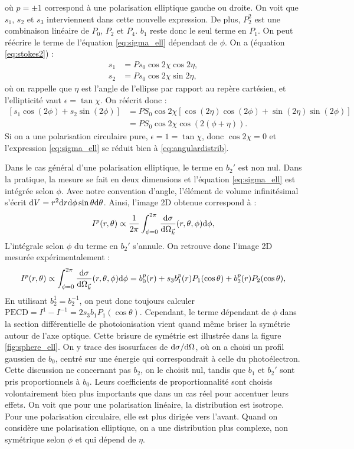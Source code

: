 où $p=\pm1$ correspond à une polarisation elliptique gauche ou droite. On voit que $s_1$, $s_2$ et $s_3$ interviennent dans cette nouvelle expression. De plus, $P_2^2$ est une combinaison linéaire de $P_0$, $P_2$ et $P_4$. $b_1$ reste donc le seul terme en $P_1$. On peut réécrire le terme de l'équation \ref{eq:sigma_ell} dépendant de $\phi$. On a (équation \ref{eq:stokes2}) :
\begin{align}
s_1 &= Ps_0\cos 2\chi\cos 2\eta ,\\
s_2 &= Ps_0\cos 2\chi\sin 2\eta,
\end{align}
où on rappelle que $\eta$ est l'angle de l'ellipse par rapport au repère cartésien, et l'ellipticité vaut $\epsilon=\tan\chi$. On réécrit donc :
\begin{align}
\left[s_1\cos(2\phi)+s_2\sin(2\phi)\right] &= PS_0\cos 2\chi\left[\cos(2\eta)\cos(2\phi)+\sin(2\eta)\sin(2\phi)\right]\\
&= PS_0\cos 2\chi \cos(2(\phi+\eta)).
\end{align}
Si on a une polarisation circulaire pure, $\epsilon = 1 = \tan\chi$, donc $\cos2\chi = 0$ et l'expression \ref{eq:sigma_ell} se réduit bien à \ref{eq:angulardistrib}.

Dans le cas général d'une polarisation elliptique, le terme en $b_2'$ est non nul. Dans la pratique, la mesure se fait en deux dimensions et l'équation \ref{eq:sigma_ell} est intégrée selon $\phi$. Avec notre convention d'angle, l'élément de volume infinitésimal s'écrit $\mathrm{d} V = r^2\mathrm{d} r \mathrm{d} \phi \sin\theta \mathrm{d} \theta$. Ainsi, l'image 2D obtenue correspond à :
\begin{equation}
I^p(r,\theta) \propto \frac{1}{2\pi}\int_{\phi=0}^{2\pi}\frac{\mathrm{d}\sigma}{\mathrm{d}\Omega_{\vec{k}}}(r,\theta,\phi)\mathrm{d}\phi,
\end{equation}
L'intégrale selon $\phi$ du terme en $b_2'$ s'annule. On retrouve donc l'image 2D mesurée expérimentalement :
\begin{equation}
I^p(r,\theta) \propto \int_{\phi=0}^{2\pi}\frac{\mathrm{d}\sigma}{\mathrm{d}\Omega_{\vec{k}}}(r,\theta,\phi)\mathrm{d}\phi = b_0^p(r)+s_3b_1^p(r)P_1(\cos\theta)+b_2^p(r)P_2(\cos\theta),
\end{equation}
En utilisant $b_2^1=b_2^{-1}$, on peut donc toujours calculer $\text{PECD} = I^1-I^{-1} = 2s_3b_1P_1(\cos\theta)$. Cependant, le terme dépendant de $\phi$ dans la section différentielle de photoionisation vient quand même briser la symétrie autour de l'axe optique. Cette brisure de symétrie est illustrée dans la figure \ref{fig:sphere_ell}. On y trace des isosurfaces de $\mathrm{d}\sigma/\mathrm{d}\Omega$, où on a choisi un profil gaussien de $b_0$, centré sur une énergie qui correspondrait à celle du photoélectron. Cette discussion ne concernant pas $b_2$, on le choisit nul, tandis que $b_1$ et $b_2'$ sont pris proportionnels à $b_0$. Leurs coefficients de proportionnalité sont choisis volontairement bien plus importants que dans un cas réel pour accentuer leurs effets. On voit que pour une polarisation linéaire, la distribution est isotrope. Pour une polarisation circulaire, elle est plus dirigée vers l'avant. Quand on considère une polarisation elliptique, on a une distribution plus complexe, non symétrique selon $\phi$ et qui dépend de $\eta$.

